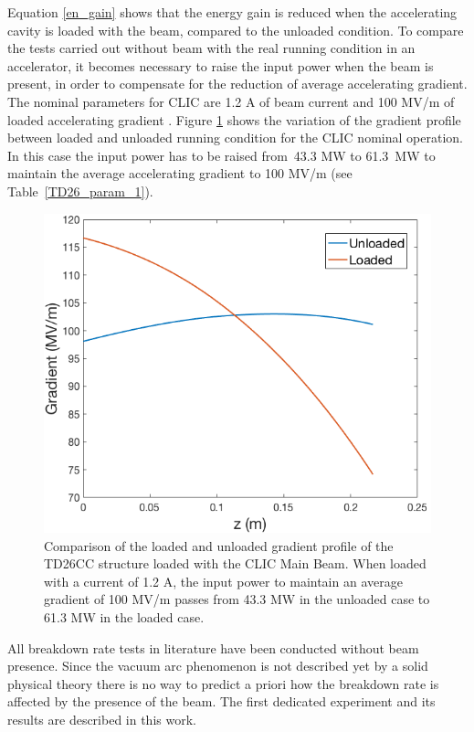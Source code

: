 Equation \ref{en_gain} shows that the energy gain is reduced when the accelerating cavity is loaded with the beam, compared to the unloaded condition. To compare the tests carried out without beam with the real running condition in an accelerator, it becomes necessary to raise the input power when the beam is present, in order to compensate for the reduction of average accelerating gradient. The nominal parameters for CLIC are 1.2 A of beam current and 100 MV/m of loaded accelerating gradient \cite{CLIC:cdr}. Figure \ref{100mvm} shows the variation of the gradient profile between loaded and unloaded running condition for the CLIC nominal operation. In this case the input power has to be raised from~43.3 MW to 61.3~MW to maintain the average accelerating gradient to 100 MV/m (see Table~\ref{TD26_param_1}).

\begin{figure}[h]
\centering 
\includegraphics[scale=0.45]{pictures/grad_vs_IP.png}
\caption{Comparison of the loaded and unloaded gradient profile of the TD26CC structure loaded with the CLIC Main Beam. When loaded with a current of 1.2 A, the input power to maintain an average gradient of 100 MV/m passes from 43.3 MW in the unloaded case to 61.3 MW in the loaded case. }
\label{100mvm}
\end{figure}

All breakdown rate tests in literature have been conducted without  beam presence. Since the vacuum arc phenomenon is not described yet by a solid physical theory there is no way to predict a priori how the breakdown rate is affected by the presence of the beam. The first dedicated experiment and its results are described in this work.

